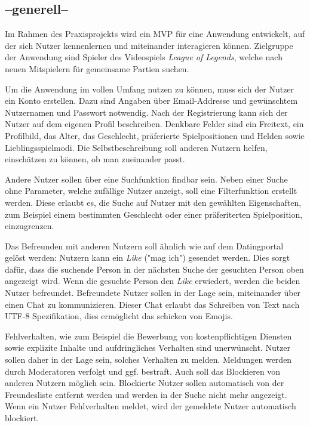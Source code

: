 \subsection{--generell--}
Im Rahmen des Praxisprojekts wird ein MVP %
für eine Anwendung entwickelt, auf der sich Nutzer kennenlernen und miteinander interagieren können.
Zielgruppe der Anwendung sind Spieler des Videospiels \textit{League of Legends}, welche nach neuen Mitspielern für gemeinsame Partien suchen.

Um die Anwendung im vollen Umfang nutzen zu können, muss sich der Nutzer ein Konto erstellen.
Dazu sind Angaben über Email-Addresse und gewünschtem Nutzernamen und Passwort notwendig.
Nach der Registrierung kann sich der Nutzer auf dem eigenen Profil beschreiben.
Denkbare Felder sind ein Freitext, ein Profilbild, das Alter, das Geschlecht, präferierte Spielpositionen und Helden sowie Lieblingsspielmodi.
Die Selbstbeschreibung soll anderen Nutzern helfen, einschätzen zu können, ob man zueinander passt.

Andere Nutzer sollen über eine Suchfunktion findbar sein.
Neben einer Suche ohne Parameter, welche zufällige Nutzer anzeigt, soll eine Filterfunktion erstellt werden.
Diese erlaubt es, die Suche auf Nutzer mit den gewählten Eigenschaften, zum Beispiel einem bestimmten Geschlecht oder einer präferiterten Spielposition, einzugrenzen.

Das Befreunden mit anderen Nutzern soll ähnlich wie auf dem Datingportal  gelöst werden: Nutzern kann ein \textit{Like} ("mag ich") gesendet werden.
Dies sorgt dafür, dass die suchende Person in der nächsten Suche der gesuchten Person oben angezeigt wird.
Wenn die gesuchte Person den \textit{Like} erwiedert, werden die beiden Nutzer befreundet.
Befreundete Nutzer sollen in der Lage sein, miteinander über einen Chat zu kommunizieren.
Dieser Chat erlaubt das Schreiben von Text nach UTF-8 Spezifikation, %
dies ermöglicht das schicken von Emojis.

Fehlverhalten, wie zum Beispiel die Bewerbung von kostenpflichtigen Diensten sowie explizite Inhalte und aufdringliches Verhalten sind unerwünscht.
Nutzer sollen daher in der Lage sein, solches Verhalten zu melden.
Meldungen werden durch Moderatoren verfolgt und ggf. bestraft.
Auch soll das Blockieren von anderen Nutzern möglich sein.
Blockierte Nutzer sollen automatisch von der Freundesliste entfernt werden und werden in der Suche nicht mehr angezeigt.
Wenn ein Nutzer Fehlverhalten meldet, wird der gemeldete Nutzer automatisch blockiert.

